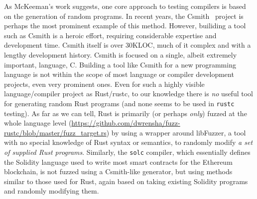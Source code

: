 As McKeeman's work suggests, one core approach to testing compilers is
based on
the generation of random programs.  In recent
years, the Csmith~\cite{csmith} project is perhaps the most prominent
example of this method.  However, builiding a tool such as Csmith
is a heroic effort, requiring considerable expertise and
development time.  Csmith itself is over 30KLOC, much of it complex
and with a lengthy development history.  Csmith is focused on a
single, albeit extremely important, language, C.  Building a tool like
Csmith for a new programming language is not within the scope of most
language or compiler development projects, even very prominent ones.  Even for such a highly
visible language/compiler project as Rust/rustc, to our knowledge
there is \emph{no} useful tool for generating random Rust programs
(and none seems to be
used in {\tt rustc} testing).  As far as we can tell, Rust
is primarily (or perhaps \emph{only}) fuzzed at the whole language
level
(\url{https://github.com/dwrensha/fuzz-rustc/blob/master/fuzz_target.rs}) by
using a wrapper around libFuzzer, a tool with no special knowledge of Rust
syntax or semantics, to randomly modify \emph{a set of supplied Rust
programs}.  Similarly, the {\tt solc} compiler, which essentially
defines the Solidity language used to write most smart contracts for
the Ethereum blockchain, is not fuzzed using a Csmith-like
generator, but using methods similar to those used for
Rust, again based on taking
existing Solidity programs and randomly modifying them.

